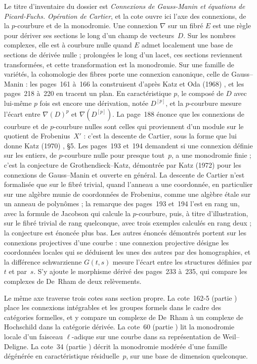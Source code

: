 Le titre d'inventaire du dossier est \emph{Connexions de Gauss-Manin et équations de Picard-Fuchs. Opération de Cartier}, et la cote ouvre ici l'axe des connexions, de la $p$-courbure et de la monodromie. Une connexion $\nabla$ sur un fibré $E$ est une règle pour dériver ses sections le long d'un champ de vecteurs~$D$. Sur les nombres complexes, elle est à courbure nulle quand $E$ admet localement une base de sections de dérivée nulle ; prolongées le long d'un lacet, ces sections reviennent transformées, et cette transformation est la monodromie. Sur une famille de variétés, la cohomologie des fibres porte une connexion canonique, celle de Gauss--Manin : les pages~161 à~166 la construisent d'après Katz et Oda (1968) \cite{katzoda1968}, et les pages~218 à~220 en tracent un plan. En caractéristique $p$, le composé de $D$ avec lui-même $p$ fois est encore une dérivation, notée $D^{[p]}$, et la $p$-courbure mesure l'écart entre $\nabla(D)^p$ et $\nabla(D^{[p]})$. La page~188 énonce que les connexions de courbure et de $p$-courbure nulles sont celles qui proviennent d'un module sur le quotient de Frobenius~$X'$ : c'est la descente de Cartier, sous la forme que lui donne Katz (1970) \cite{katz1970}, §5. Les pages~193 et~194 demandent si une connexion définie sur les entiers, de $p$-courbure nulle pour presque tout~$p$, a une monodromie finie ; c'est la conjecture de Grothendieck--Katz, démontrée par Katz (1972) \cite{katz1972} pour les connexions de Gauss--Manin et ouverte en général. La descente de Cartier n'est formalisée que sur le fibré trivial, quand l'anneau a une coordonnée, en particulier sur une algèbre munie de coordonnées de Frobenius, comme une algèbre étale sur un anneau de polynômes ; la remarque des pages~193 et~194 l'est en rang un, avec la formule de Jacobson qui calcule la $p$-courbure, puis, à titre d'illustration, sur le fibré trivial de rang quelconque, avec trois exemples calculés en rang deux ; la conjecture est énoncée plus bas. Les autres énoncés démontrés portent sur les connexions projectives d'une courbe : une connexion projective désigne les coordonnées locales qui se déduisent les unes des autres par des homographies, et la différence schwarzienne $G(t, s)$ mesure l'écart entre les structures définies par $t$ et par~$s$. S'y ajoute le morphisme dérivé des pages~233 à~235, qui compare les complexes de De~Rham de deux relèvements.

Le même axe traverse trois cotes sans section propre. La cote~162-5 (partie ) place les connexions intégrables et les groupes formels dans le cadre des catégories formelles, et y compare un complexe de De~Rham à un complexe de Hochschild dans la catégorie dérivée. La cote~60 (partie ) lit la monodromie locale d'un faisceau $\ell$-adique sur une courbe dans sa représentation de Weil--Deligne. La cote~34 (partie ) décrit la monodromie modérée d'une famille dégénérée en caractéristique résiduelle~$p$, sur une base de dimension quelconque.

